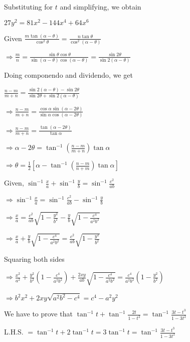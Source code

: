   Substituting for $t$ and simplifying, we obtain

  $27y^2 = 81x^2 -144x^4 + 64x^6$

\item Given $\frac{m\tan(\alpha - \theta)}{\cos^2\theta} = \frac{n\tan\theta}{\cos^2(\alpha - \theta)}$

  $\Rightarrow \frac{m}{n} = \frac{\sin\theta\cos\theta}{\sin(\alpha - \theta)\cos(\alpha - \theta)} =
  \frac{\sin2\theta}{\sin2(\alpha - \theta)}$

  Doing componendo and dividendo, we get

  $\frac{n - m}{m + n} = \frac{\sin2(\alpha - \theta) - \sin2\theta}{\sin2\theta + \sin2(\alpha - \theta)}$

  $\Rightarrow \frac{n - m}{m + n} = \frac{\cos\alpha\sin(\alpha - 2\theta)}{\sin\alpha\cos(\alpha - 2\theta)}$

  $\Rightarrow \frac{n - m}{m + n} = \frac{\tan(\alpha - 2\theta)}{\tan\alpha}$

  $\Rightarrow \alpha - 2\theta = \tan^{-1}\left(\frac{n - m}{m + n}\right)\tan\alpha$

  $\Rightarrow \theta = \frac{1}{2}\left[\alpha - \tan^{-1}\left(\frac{n - m}{n + m}\right)\tan\alpha\right]$

\item Given, $\sin^{-1}\frac{x}{a} + \sin^{-1}\frac{y}{b} = \sin^{-1}\frac{c^2}{ab}$

  $\Rightarrow \sin^{-1}\frac{x}{a} = \sin^{-1}\frac{c^2}{ab} - \sin^{-1}\frac{y}{b}$

  $\Rightarrow \frac{x}{a}  = \frac{c^2}{ab}\sqrt{1 - \frac{y^2}{b^2}} - \frac{y}{b}\sqrt{1 - \frac{c^4}{a^2b^2}}$

  $\Rightarrow \frac{x}{a} + \frac{y}{b}\sqrt{1 - \frac{c^4}{a^2b^2}} = \frac{c^2}{ab}\sqrt{1 - \frac{y^2}{b^2}}$

  Squaring both sides

  $\Rightarrow \frac{x^2}{a^2} + \frac{y^2}{b^2}\left(1 - \frac{c^4}{a^2b^2}\right) + \frac{2xy}{ab}\sqrt{1 -
    \frac{c^4}{a^2b^2}} = \frac{c^4}{a^2b^2}\left(1 - \frac{y^2}{b^2}\right)$

  $\Rightarrow b^2x^2 + 2xy\sqrt{a^2b^2 - c^4} = c^4 - a^2y^2$

\item We have to prove that $\tan^{-1}t + \tan^{-1}\frac{2t}{1 - t^2} = \tan^{-1}\frac{3t - t^3}{1 - 3t^2}$

  L.H.S. $= \tan^{-1}t + 2\tan^{-1}t = 3\tan^{-1}t = \tan^{-1}\frac{3t - t^3}{1 - 3t^2}$

